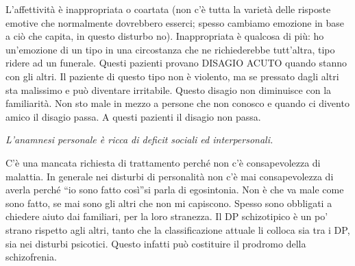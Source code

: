 \documentclass[]{article}
\begin{document}
L'affettività è inappropriata o coartata (non c'è tutta la varietà delle
risposte emotive che normalmente dovrebbero esserci; spesso cambiamo
emozione in base a ciò che capita, in questo disturbo no). Inappropriata
è qualcosa di più: ho un'emozione di un tipo in una circostanza che ne
richiederebbe tutt'altra, tipo ridere ad un funerale. Questi pazienti
provano DISAGIO ACUTO quando stanno con gli altri. Il paziente di questo
tipo non è violento, ma se pressato dagli altri sta malissimo e può
diventare irritabile. Questo disagio non diminuisce con la familiarità.
Non sto male in mezzo a persone che non conosco e quando ci divento
amico il disagio passa. A questi pazienti il disagio non passa.

\emph{\emph{L'anamnesi personale è ricca di deficit sociali ed
interpersonali. }}

C'è una mancata richiesta di trattamento perché non c'è consapevolezza
di malattia. In generale nei disturbi di personalità non c'è mai
consapevolezza di averla perché ``io sono fatto così''si parla di
egosintonia. Non è che va male come sono fatto, se mai sono gli altri
che non mi capiscono. Spesso sono obbligati a chiedere aiuto dai
familiari, per la loro stranezza. Il DP schizotipico è un po' strano
rispetto agli altri, tanto che la classificazione attuale li colloca sia
tra i DP, sia nei disturbi psicotici. Questo infatti può costituire il
prodromo della schizofrenia.
\end{document}
